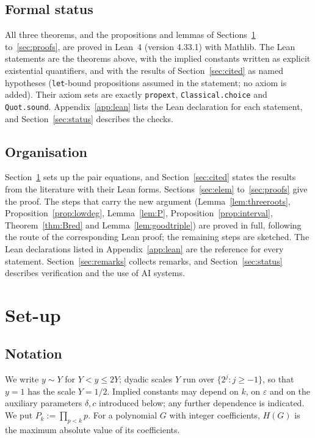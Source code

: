 \documentclass[11pt,reqno]{amsart}
\theoremstyle{definition}
\theoremstyle{remark}
\numberwithin{equation}{section}
\begin{document}
\subsection{Formal status}\label{sec:formalstatus}
All three theorems, and the propositions and lemmas of Sections~\ref{sec:setup}
to~\ref{sec:proofs}, are proved in Lean~4 (version 4.33.1) with Mathlib. The
Lean statements are the theorems above, with the implied constants written as
explicit existential quantifiers, and with the results of
Section~\ref{sec:cited} as named hypotheses (\texttt{let}-bound propositions
assumed in the statement; no axiom is added). Their axiom sets are exactly
\texttt{propext}, \texttt{Classical.choice} and \texttt{Quot.sound}.
Appendix~\ref{app:lean} lists the Lean declaration for each statement, and
Section~\ref{sec:status} describes the checks.

\subsection*{Organisation}
Section~\ref{sec:setup} sets up the pair equations, and Section~\ref{sec:cited}
states the results from the literature with their Lean forms. Sections~\ref{sec:elem}
to~\ref{sec:proofs} give the proof. The steps that carry the new argument
(Lemma~\ref{lem:threeroots}, Proposition~\ref{prop:lowdeg},
Lemma~\ref{lem:P}, Proposition~\ref{prop:interval},
Theorem~\ref{thm:Bred} and Lemma~\ref{lem:goodtriple}) are proved in full,
following the route of the corresponding Lean proof; the remaining steps are
sketched. The Lean declarations listed in Appendix~\ref{app:lean} are the
reference for every statement. Section~\ref{sec:remarks} collects remarks, and
Section~\ref{sec:status} describes verification and the use of AI systems.

\section{Set-up}\label{sec:setup}

\subsection{Notation}
We write $y\sim Y$ for $Y<y\le 2Y$; dyadic scales $Y$ run over
$\{2^j:j\ge-1\}$, so that $y=1$ has the scale $Y=1/2$. Implied constants may
depend on $k$, on $\varepsilon$ and on the auxiliary parameters $\delta,c$
introduced below; any further dependence is indicated. We put
$P_k:=\prod_{p<k}p$. For a polynomial $G$ with integer coefficients, $H(G)$ is
the maximum absolute value of its coefficients.
\end{document}
